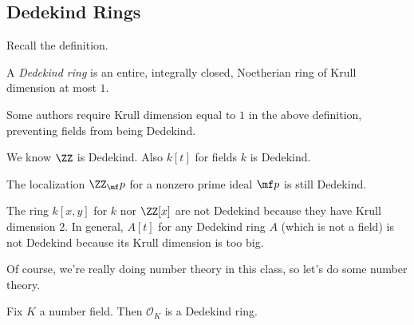 




\subsection{Dedekind Rings}
Recall the definition.
\begin{defi}[Dedekind]
    A \textit{Dedekind ring} is an entire, integrally closed, Noetherian ring of Krull dimension at most $1.$
\end{defi}
\begin{warn}
    Some authors require Krull dimension equal to $1$ in the above definition, preventing fields from being Dedekind.
\end{warn}
\begin{ex}
    We know $\ZZ$ is Dedekind. Also $k[t]$ for fields $k$ is Dedekind.
\end{ex}
\begin{ex}
    The localization $\ZZ_\mf p$ for a nonzero prime ideal $\mf p$ is still Dedekind.
\end{ex}
\begin{nex}
    The ring $k[x,y]$ for $k$ nor $\ZZ[x]$ are not Dedekind because they have Krull dimension $2.$ In general, $A[t]$ for any Dedekind ring $A$ (which is not a field) is not Dedekind because its Krull dimension is too big.
\end{nex}
Of course, we're really doing number theory in this class, so let's do some number theory.
\begin{thm}
    Fix $K$ a number field. Then $\mathcal O_K$ is a Dedekind ring.
\end{thm}
